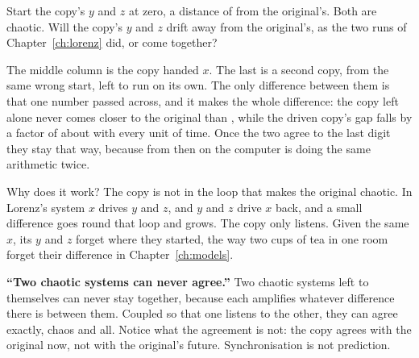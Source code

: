 \begin{think}
Start the copy's $y$ and $z$ at zero, a distance of  from
the original's. Both are chaotic. Will the copy's $y$ and $z$ drift away from
the original's, as the two runs of Chapter~\ref{ch:lorenz} did, or come
together?
\end{think}



\noindent
The middle column is the copy handed $x$. The last is a second copy, from the
same wrong start, left to run on its own. The only difference between them is
that one number passed across, and it makes the whole difference: the copy
left alone never comes closer to the original than , while
the driven copy's gap falls by a factor of about  with
every unit of time. Once the two agree to the last digit they stay that way,
because from then on the computer is doing the same arithmetic twice.

Why does it work? The copy is not in the loop that makes the original
chaotic. In Lorenz's system $x$ drives $y$ and $z$, and $y$ and $z$ drive $x$
back, and a small difference goes round that loop and grows. The copy only
listens. Given the same $x$, its $y$ and $z$ forget where they started, the
way two cups of tea in one room forget their difference in
Chapter~\ref{ch:models}.


\begin{trapbox}
\textbf{\enquote{Two chaotic systems can never agree.}} Two chaotic systems
left to themselves can never stay together, because each amplifies whatever
difference there is between them. Coupled so that one listens to the other,
they can agree exactly, chaos and all. Notice what the agreement is not: the
copy agrees with the original now, not with the original's future.
Synchronisation is not prediction.
\end{trapbox}

